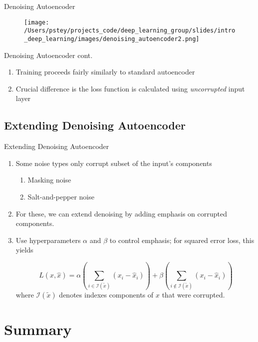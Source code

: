 \documentclass[pdf]{beamer}
\begin{document}
						
			
			\begin{frame}{Denoising Autoencoder}
			\begin{figure}
				\texttt{[image: /Users/pstey/projects\_code/deep\_learning\_group/slides/intro\_deep\_learning/images/denoising\_autoencoder2.png]}
			\end{figure}	
			\end{frame}
	

			\begin{frame}{Denoising Autoencoder cont.}
			\begin{enumerate}
				\item Training proceeds fairly similarly to standard autoencoder 
				\item Crucial difference is the loss function is calculated using \textit{uncorrupted} input layer 
			\end{enumerate}
			\end{frame}
			
			
	\subsection{Extending Denoising Autoencoder}
		\begin{frame} {Extending Denoising Autoencoder}
		\begin{enumerate}
			\item Some noise types only corrupt subset of the input's components 
			\begin{enumerate}[1]
				\item Masking noise
				\item Salt-and-pepper noise
			\end{enumerate}
			\item For these, we can extend denoising by adding emphasis on corrupted components.
			\item Use hyperparameters $\alpha$ and $\beta$ to control emphasis; for squared error loss, this yields
		
			$$ L(x, \hat{x}) = \alpha \left( \sum_{i \in \mathcal{I}(\tilde{x})} \left(x_i - \hat{x}_i \right) \right)   + \beta \left( \sum_{i \notin \mathcal{I}(\tilde{x})} \left(x_i - \hat{x}_i \right) \right)$$
			where $ \mathcal{I}(\tilde{x}) $ denotes indexes components of $x$ that were corrupted.
		\end{enumerate}
		\end{frame}




\section{Summary}
\end{document}
